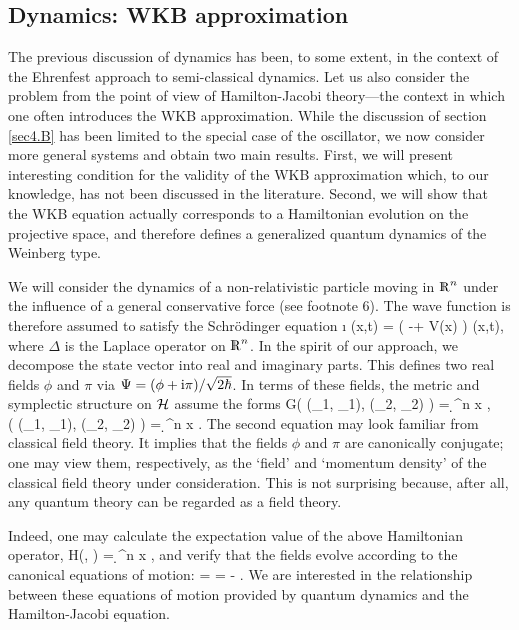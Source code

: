 \subsection{Dynamics: WKB approximation} \label{sec4.C}

The previous discussion of dynamics has been, to some extent, in the
context of the Ehrenfest approach to semi-classical dynamics.  Let us
also consider the problem from the point of view of Hamilton-Jacobi
theory---the context in which one often introduces the WKB
approximation.  While the discussion of section \ref{sec4.B} has been
limited to the special case of the oscillator, we now consider more
general systems and obtain two main results.  First, we will present
interesting condition for the validity of the WKB approximation which,
to our knowledge, has not been discussed in the literature.  Second,
we will show that the WKB equation actually corresponds to a
Hamiltonian evolution on the projective space, and therefore defines a
generalized quantum dynamics of the Weinberg type.

We will consider the dynamics of a non-relativistic particle moving in
$\R^n$ under the influence of a general conservative force (see
footnote 6). The wave function is therefore assumed to satisfy the
Schr\"odinger equation
%
\be
\i\hbar {} \Psi(x,t) =
\left( -\Delta + V(x) \right) \Psi(x,t),
\ee
%
where $\Delta$ is the Laplace operator on $\R^n$.  In the spirit of
our approach, we decompose the state vector into real and imaginary
parts.  This defines two real fields $\phi$ and $\pi$ via $\Psi =
(\phi + \mathrm{i}\pi)/\sqrt{2\hbar}$.  In terms of these fields, the metric
and symplectic structure on ${\cal H}$ assume the forms
%
\ba
G( (\phi_1, \pi_1), (\phi_2, \pi_2) ) =  \int \d^n \! x 
, \\ 
%
 \W( (\phi_1, \pi_1), (\phi_2, \pi_2) ) = \int \d^n \! x 
.
\ea
%
The second equation may look familiar from classical field theory.  It
implies that the fields $\phi$ and $\pi$ are canonically conjugate;
one may view them, respectively, as the `field' and `momentum density'
of the classical field theory under consideration.  This is not
surprising because, after all, any quantum theory can be regarded as a
field theory.

Indeed, one may calculate the expectation value of the above
Hamiltonian operator,
%
\be
H(\phi, \pi) =  \int \d^n \! x  ,
\ee
%
and verify that the fields evolve according to the canonical equations
of motion:
%
\be \label{eqs-of-motion}
 = 
 \quad
  = - .
\ee
%
We are interested in the relationship between these equations of
motion provided by quantum dynamics and the Hamilton-Jacobi equation.

